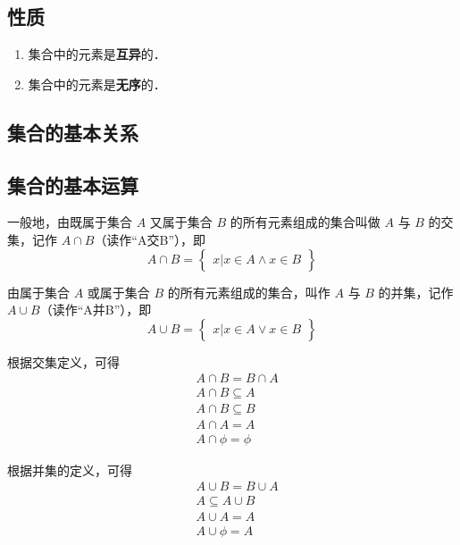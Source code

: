 \subsection{性质}
\begin{enumerate}
\item 集合中的元素是\textbf{互异}的．
\item 集合中的元素是\textbf{无序}的．
\end{enumerate}

\subsection{集合的基本关系}

\subsection{集合的基本运算}
一般地，由既属于集合 $A$ 又属于集合 $B$ 的所有元素组成的集合叫做 $A$ 与 $B$ 的交集，记作 $A \cap B$（读作“A交B”），即
\begin{equation}
A\cap B = \begin{Bmatrix} x|x\in A \wedge x\in B \end{Bmatrix}
\end{equation}

由属于集合 $A$ 或属于集合 $B$ 的所有元素组成的集合，叫作 $A$ 与 $B$ 的并集，记作 $A\cup B$（读作“A并B”），即
\begin{equation}
A\cup B = \begin{Bmatrix}x|x\in A \vee x\in B\end{Bmatrix}
\end{equation}

根据交集定义，可得
\begin{equation}
\begin{aligned}
&A\cap B = B\cap A \\ 
&A\cap B \subseteq A \\
&A\cap B \subseteq B \\
&A\cap A = A \\
&A\cap \phi = \phi
\end{aligned}
\end{equation}

根据并集的定义，可得
\begin{equation}
\begin{aligned}
&A\cup B = B\cup A \\
&A\subseteq A\cup B \\
&A\cup A = A \\
&A\cup \phi = A
\end{aligned}
\end{equation}


